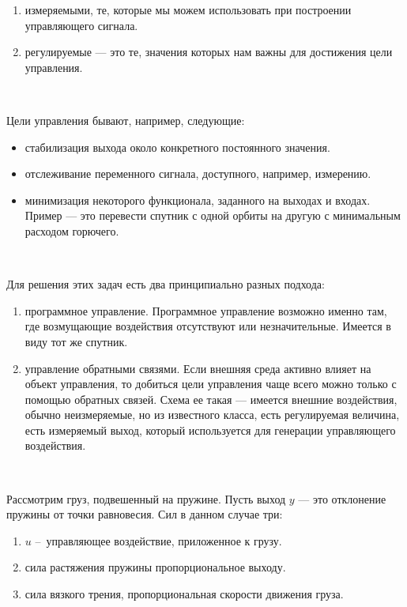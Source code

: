 \begin{enumerate}
 \item измеряемыми, те, которые мы можем использовать при построении управляющего сигнала.
 \item регулируемые — это те, значения которых нам важны для достижения цели управления.
\end{enumerate}
\

Цели управления бывают, например, следующие: \\

\begin{itemize}
  \item стабилизация выхода около конкретного постоянного значения. 
  \item отслеживание переменного сигнала, доступного, например, измерению.
  \item минимизация некоторого функционала, заданного на выходах и входах. Пример — это перевести спутник с одной орбиты на другую с минимальным расходом горючего.
\end{itemize}
\

Для решения этих задач есть два принципиально разных подхода: \\

\begin{enumerate}
  \item программное управление. Программное управление возможно именно там, где возмущающие воздействия отсутствуют или незначительные. Имеется в виду тот же спутник. 
  \item управление обратными связями. Если внешняя среда активно влияет на объект управления, то добиться цели управления чаще всего можно только с помощью обратных связей. Схема ее такая — имеется внешние воздействия, обычно неизмеряемые, но из известного класса, есть регулируемая величина, есть измеряемый выход, который используется для генерации управляющего воздействия.
\end{enumerate}
\



Рассмотрим груз, подвешенный на пружине. Пусть выход $y$ — это отклонение пружины от точки равновесия. Сил в данном случае три: \\

\begin{enumerate}
  \item $u$ – управляющее воздействие, приложенное к грузу. 
  \item сила растяжения пружины пропорциональное выходу.
  \item сила вязкого трения, пропорциональная скорости движения груза.
\end{enumerate}
\

